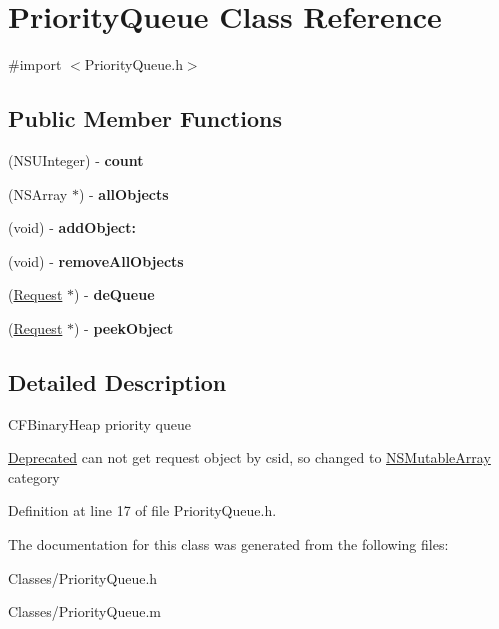 \hypertarget{interface_priority_queue}{
\section{PriorityQueue Class Reference}
\label{interface_priority_queue}
}


{\ttfamily \#import $<$PriorityQueue.h$>$}

\subsection*{Public Member Functions}
\begin{DoxyCompactItemize}
\item 
\hypertarget{interface_priority_queue_a908c802735aaad6bb718dea5e2abacec}{
(NSUInteger) -\/ {\bfseries count}}
\label{interface_priority_queue_a908c802735aaad6bb718dea5e2abacec}

\item 
\hypertarget{interface_priority_queue_ad5cc23dd2f1b12fd146dd5a2c4c99ca7}{
(NSArray $\ast$) -\/ {\bfseries allObjects}}
\label{interface_priority_queue_ad5cc23dd2f1b12fd146dd5a2c4c99ca7}

\item 
\hypertarget{interface_priority_queue_a00440f49a39a9656d1fe8ed5c8993cf8}{
(void) -\/ {\bfseries addObject:}}
\label{interface_priority_queue_a00440f49a39a9656d1fe8ed5c8993cf8}

\item 
\hypertarget{interface_priority_queue_a263619d4f2cf50636e85271fe47767ba}{
(void) -\/ {\bfseries removeAllObjects}}
\label{interface_priority_queue_a263619d4f2cf50636e85271fe47767ba}

\item 
\hypertarget{interface_priority_queue_af6e2ec735906e0993b23449f0f1cf1a0}{
(\hyperlink{interface_request}{Request} $\ast$) -\/ {\bfseries deQueue}}
\label{interface_priority_queue_af6e2ec735906e0993b23449f0f1cf1a0}

\item 
\hypertarget{interface_priority_queue_a405560441f236c23c564c75b1a447029}{
(\hyperlink{interface_request}{Request} $\ast$) -\/ {\bfseries peekObject}}
\label{interface_priority_queue_a405560441f236c23c564c75b1a447029}

\end{DoxyCompactItemize}


\subsection{Detailed Description}
CFBinaryHeap priority queue \begin{Desc}
\item[\hyperlink{deprecated__deprecated000001}{Deprecated}]can not get request object by csid, so changed to \hyperlink{class_n_s_mutable_array}{NSMutableArray} category \end{Desc}


Definition at line 17 of file PriorityQueue.h.



The documentation for this class was generated from the following files:\begin{DoxyCompactItemize}
\item 
Classes/PriorityQueue.h\item 
Classes/PriorityQueue.m\end{DoxyCompactItemize}
